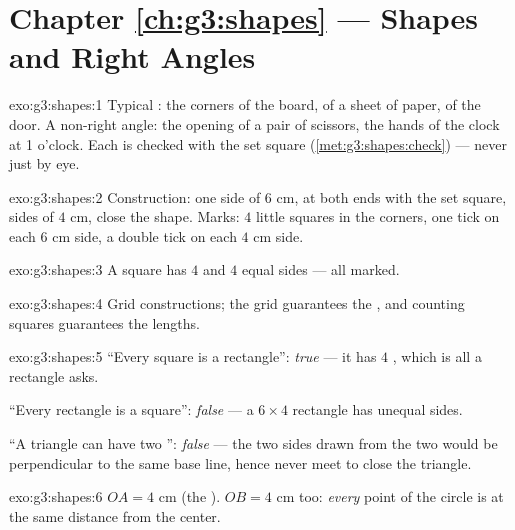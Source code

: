 \section*{Chapter \ref{ch:g3:shapes} --- Shapes and Right Angles}

\begin{solution}{exo:g3:shapes:1}
Typical : the corners of the board, of a sheet of paper,
of the door. A non-right angle: the opening of a pair of scissors,
the hands of the clock at 1 o'clock. Each is checked with the set
square (\cref{met:g3:shapes:check}) --- never just by eye.
\end{solution}

\begin{solution}{exo:g3:shapes:2}
Construction: one side of $6$ cm,  at both ends with the
set square, sides of $4$ cm, close the shape. Marks: $4$ little
squares in the corners, one tick on each $6$ cm side, a double tick
on each $4$ cm side.
\end{solution}

\begin{solution}{exo:g3:shapes:3}
A square has $4$  and $4$ equal sides --- all marked.
\end{solution}

\begin{solution}{exo:g3:shapes:4}
Grid constructions; the grid guarantees the , and
counting squares guarantees the lengths.
\end{solution}

\begin{solution}{exo:g3:shapes:5}
``Every square is a rectangle'': \emph{true} --- it has $4$ , which is all a rectangle asks.

``Every rectangle is a square'': \emph{false} --- a $6 \times 4$
rectangle has unequal sides.

``A triangle can have two '': \emph{false} --- the two
sides drawn from the two  would be perpendicular to the
same base line, hence never meet to close the triangle.
\end{solution}

\begin{solution}{exo:g3:shapes:6}
$OA = 4$ cm (the ). $OB = 4$ cm too: \emph{every} point of
the circle is at the same distance from the center.
\end{solution}

